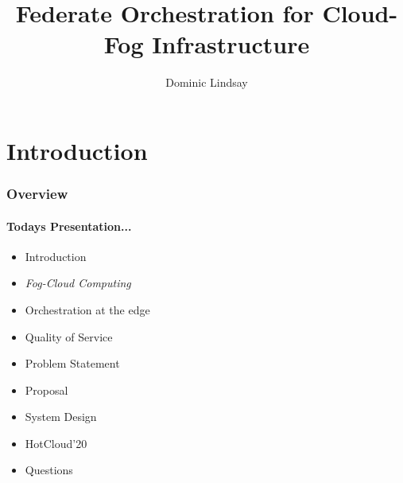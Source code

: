 \documentclass{beamer}
\title{Federate Orchestration for Cloud-Fog Infrastructure}
\author{Dominic Lindsay}
\institute{Lancaster Univeristy}
\begin{document}
	
	\frame{\titlepage}
	
	\section{Introduction}
	\begin{frame}
		\frametitle{Overview}
		\framesubtitle{Todays Presentation...}
		\begin{itemize}
			\item Introduction
			\item \textit{Fog-Cloud Computing}
			\item Orchestration at the edge
			\item Quality of Service
			\item Problem Statement
			\item Proposal
			\item System Design
			\item HotCloud'20 
			\item Questions
		\end{itemize}
	\end{frame}
\end{document}
